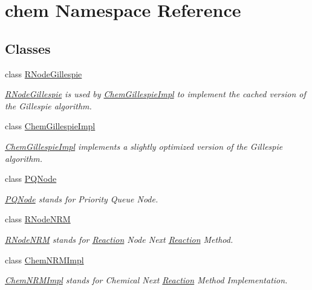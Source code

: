 \hypertarget{namespacechem}{\section{chem Namespace Reference}
\label{namespacechem}
}
\subsection*{Classes}
\begin{DoxyCompactItemize}
\item 
class \hyperlink{classchem_1_1RNodeGillespie}{R\-Node\-Gillespie}
\begin{DoxyCompactList}\small\item\em \hyperlink{classchem_1_1RNodeGillespie}{R\-Node\-Gillespie} is used by \hyperlink{classchem_1_1ChemGillespieImpl}{Chem\-Gillespie\-Impl} to implement the cached version of the Gillespie algorithm. \end{DoxyCompactList}\item 
class \hyperlink{classchem_1_1ChemGillespieImpl}{Chem\-Gillespie\-Impl}
\begin{DoxyCompactList}\small\item\em \hyperlink{classchem_1_1ChemGillespieImpl}{Chem\-Gillespie\-Impl} implements a slightly optimized version of the Gillespie algorithm. \end{DoxyCompactList}\item 
class \hyperlink{classchem_1_1PQNode}{P\-Q\-Node}
\begin{DoxyCompactList}\small\item\em \hyperlink{classchem_1_1PQNode}{P\-Q\-Node} stands for Priority Queue Node. \end{DoxyCompactList}\item 
class \hyperlink{classchem_1_1RNodeNRM}{R\-Node\-N\-R\-M}
\begin{DoxyCompactList}\small\item\em \hyperlink{classchem_1_1RNodeNRM}{R\-Node\-N\-R\-M} stands for \hyperlink{classchem_1_1Reaction}{Reaction} Node Next \hyperlink{classchem_1_1Reaction}{Reaction} Method. \end{DoxyCompactList}\item 
class \hyperlink{classchem_1_1ChemNRMImpl}{Chem\-N\-R\-M\-Impl}
\begin{DoxyCompactList}\small\item\em \hyperlink{classchem_1_1ChemNRMImpl}{Chem\-N\-R\-M\-Impl} stands for Chemical Next \hyperlink{classchem_1_1Reaction}{Reaction} Method Implementation. \end{DoxyCompactList}\item 

\end{DoxyCompactItemize}

